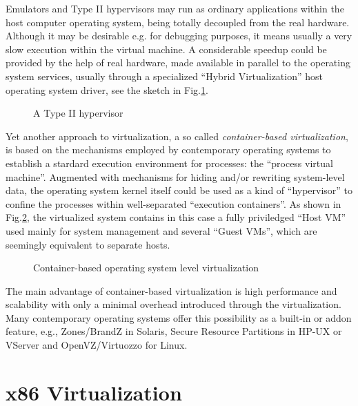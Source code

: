 \documentclass[11pt,a4paper]{llncs}
\begin{document}
Emulators and Type II hypervisors may run as ordinary applications within
the host computer operating system, being totally decoupled from the real
hardware. Although it may be desirable e.g. for debugging purposes, it means
usually a very slow execution within the virtual machine. 
A considerable speedup could be provided by the help of real hardware, made
available in parallel to the operating system services, usually through 
a specialized ``Hybrid Virtualization'' host operating system driver, see 
the sketch in Fig.\ref{hv-t2}.
\begin{figure}[h] 
\begin{center} 
\end{center} 
\caption{A Type II hypervisor} 
\label{hv-t2} 
\end{figure} 



Yet another approach to virtualization, a so called 
{\em container-based virtualization},
is based on the mechanisms employed by contemporary operating systems
to establish a stardard execution environment for processes: 
the ``process virtual machine''.
Augmented with mechanisms for hiding and/or rewriting system-level data, 
the operating system kernel itself could be used as a kind of ``hypervisor'' 
to confine the processes within well-separated ``execution containers''. 
As shown in Fig.\ref{cvm}, the virtualized system contains in this case 
a fully priviledged ``Host VM'' used mainly for system management and several 
``Guest VMs'', which are seemingly equivalent to separate hosts.
\begin{figure}[h] 
\begin{center} 
\end{center} 
\caption{Container-based operating system level virtualization } 
\label{cvm} 
\end{figure} 
The main advantage of container-based virtualization is high performance and 
scalability with only a minimal overhead introduced through the virtualization.
Many contemporary operating systems offer this possibility as a built-in or 
addon feature, e.g., Zones/BrandZ in Solaris, Secure Resource Partitions in
HP-UX or VServer and OpenVZ/Virtuozzo for Linux. 



\section{x86 Virtualization}
\end{document}
